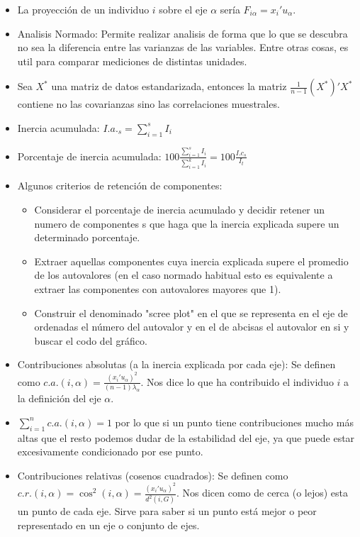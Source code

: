 \documentclass{article}
\begin{document}
\begin{itemize}
    \item La proyección de un individuo $i$ sobre el eje $\alpha$ sería $F_{i\alpha} = x_i'u_\alpha$.
    \item Analisis Normado: Permite realizar analisis de forma que lo que se descubra no sea la diferencia entre las varianzas de las variables. Entre otras cosas, es util para comparar mediciones de distintas unidades.
    \item Sea $X^*$ una matriz de datos estandarizada, entonces la matriz $\frac{1}{n-1}(X^*)'X^*$ contiene no las covarianzas sino las correlaciones muestrales.
    \item Inercia acumulada: $I.a._s = \sum_{i=1}^{s}I_i$
    \item Porcentaje de inercia acumulada: $100\frac{\sum_{i=1}^{s}I_i}{\sum_{i=1}^{k}I_i} = 100\frac{I.c_s}{I_t}$
    \item Algunos criterios de retención de componentes:
          \begin{itemize}
              \item Considerar el porcentaje de inercia acumulado y decidir retener un numero de componentes s que haga que la inercia explicada supere un determinado porcentaje.
              \item Extraer aquellas componentes cuya inercia explicada supere el promedio de los autovalores (en el caso normado habitual esto es equivalente a extraer las componentes con autovalores mayores que 1).
              \item Construir el denominado "scree plot" en el que se representa en el eje de ordenadas el número del autovalor y en el de abcisas el autovalor en si y buscar el codo del gráfico.
          \end{itemize}
    \item Contribuciones absolutas (a la inercia explicada por cada eje): Se definen como $c.a.(i,\alpha)=\frac{(x_i'u_\alpha)^2}{(n-1)\lambda_\alpha}$. Nos dice lo que ha contribuido el individuo $i$ a la definición del eje $\alpha$.
    \item $\sum_{i=1}^{n}c.a.(i,\alpha)=1$ por lo que si un punto tiene contribuciones mucho más altas que el resto podemos dudar de la estabilidad del eje, ya que puede estar excesivamente condicionado por ese punto.
    \item Contribuciones relativas (cosenos cuadrados): Se definen como $c.r.(i,\alpha)=\cos^2(i,\alpha)=\frac{(x_i'u_\alpha)^2}{d^2(i,G)}$. Nos dicen como de cerca (o lejos) esta un punto de cada eje. Sirve para saber si un punto está mejor o peor representado en un eje o conjunto de ejes.

\end{itemize}
\end{document}
